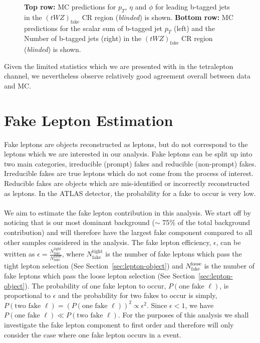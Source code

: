 \begin{figure}[htbp]
    \caption{\textbf{Top row:} MC predictions for $p_{T}$, $\eta$ and $\phi$ for leading b-tagged jets in the $(tWZ)_{\text{fake}}$ CR region (\textit{blinded}) is shown. \textbf{Bottom row:} MC predictions for the scalar sum of b-tagged jet $p_{T}$ (left) and the Number of b-tagged jets (right) in the $(tWZ)_{\text{fake}}$ CR region (\textit{blinded}) is shown.}
  \label{fig:4lep-tWZ-fake-CR-bjetPlots}
\end{figure}


Given the limited statistics which we are presented with in the tetralepton channel, we nevertheless observe relatively good agreement overall between data and MC.

\section{Fake Lepton Estimation}
\label{sec:fakelepest}
Fake leptons are objects reconstructed as leptons, but do not correspond to the leptons which we are interested in our analysis. Fake leptons can be split up into two main categories, irreducible (prompt) fakes and reducible (non-prompt) fakes. Irreducible fakes are true leptons which do not come from the process of interest. Reducible fakes are objects which are mis-identified or incorrectly reconstructed as leptons. In the ATLAS detector, the probability for a fake to occur is very low.\\\\

We aim to estimate the fake lepton contribution in this analysis. We start off by noticing that \ttZ is our most dominant background ($\sim$ 75$\%$ of the total background contribution) and will therefore have the largest fake component compared to all other samples considered in the analysis. The fake lepton efficiency, $\epsilon$, can be written as $\epsilon = \frac{N_{\text{fake}}^{\text{tight}}}{N_{\text{fake}}^{\text{loose}}}$, where $N_{\text{fake}}^{\text{tight}}$ is the number of fake leptons which pass the tight lepton selection (See Section~\ref{sec:lepton-object}) and $N_{\text{fake}}^{\text{loose}}$ is the number of fake leptons which pass the loose lepton selection (See Section~\ref{sec:lepton-object}). The probability of one fake lepton to occur, $P(\text{one fake }\ell)$, is proportional to $\epsilon$ and the probability for two fakes to occur is simply, $P(\text{two fake }\ell) = (P(\text{one fake }\ell))^{2} \propto \epsilon^{2}$. Since $\epsilon < 1$, we have $P(\text{one fake }\ell) \ll P(\text{two fake }\ell)$. For the purposes of this analysis we shall investigate the fake lepton component to first order and therefore will only consider the case where one fake lepton occurs in a \ttZ event.\\\\

